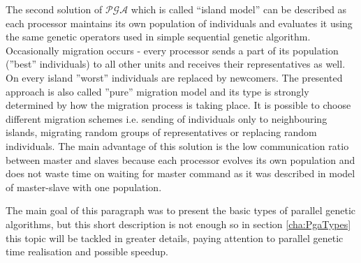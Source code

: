 The second solution of $\mathcal{PGA}$ which is called ``island model'' can be
described as each processor maintains its own
population of individuals and evaluates it using the same genetic
operators used in simple sequential genetic algorithm. Occasionally migration occurs - every processor 
sends a part of its population (”best” individuals) to all 
other units and receives their representatives as well. On 
every island ”worst” individuals are replaced by newcomers.
The presented approach is also called ”pure” migration 
model and its type is strongly determined by how the migration process is taking
place. It is possible to choose different migration schemes 
i.e. sending of individuals only to neighbouring islands, 
migrating random groups of representatives or replacing random individuals. The
main advantage of this solution is the low communication ratio between master and
slaves because each processor evolves its own population and does not waste time on
waiting for master command as it was described in model of master-slave with one
population.

The main goal of this paragraph was to present the
basic types of parallel genetic algorithms, but this short description is
not enough so in section \ref{cha:PgaTypes} this
topic will be tackled in greater details, paying attention to parallel genetic time
realisation and possible speedup. 
